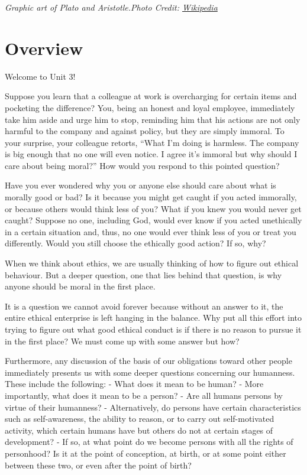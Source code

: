 \documentclass[
]{book}
\begin{document}
\emph{Graphic art of Plato and Aristotle.Photo Credit: \href{https://en.wikipedia.org/wiki/Aristotle\#/media/File:Sanzio_01_Plato_Aristotle.jpg}{Wikipedia}}

\hypertarget{overview-2}{%
\section*{Overview}\label{overview-2}}

Welcome to Unit 3!

Suppose you learn that a colleague at work is overcharging for certain items and pocketing the difference? You, being an honest and loyal employee, immediately take him aside and urge him to stop, reminding him that his actions are not only harmful to the company and against policy, but they are simply immoral. To your surprise, your colleague retorts, ``What I'm doing is harmless. The company is big enough that no one will even notice. I agree it's immoral but why should I care about being moral?'' How would you respond to this pointed question?

Have you ever wondered why you or anyone else should care about what is morally good or bad? Is it because you might get caught if you acted immorally, or because others would think less of you? What if you knew you would never get caught? Suppose no one, including God, would ever know if you acted unethically in a certain situation and, thus, no one would ever think less of you or treat you differently. Would you still choose the ethically good action? If so, why?

When we think about ethics, we are usually thinking of how to figure out ethical behaviour. But a deeper question, one that lies behind that question, is why anyone should be moral in the first place.

It is a question we cannot avoid forever because without an answer to it, the entire ethical enterprise is left hanging in the balance. Why put all this effort into trying to figure out what good ethical conduct is if there is no reason to pursue it in the first place? We must come up with some answer but how?

Furthermore, any discussion of the basis of our obligations toward other people immediately presents us with some deeper questions concerning our humanness. These include the following:
- What does it mean to be human?
- More importantly, what does it mean to be a person?
- Are all humans persons by virtue of their humanness?
- Alternatively, do persons have certain characteristics such as self-awareness, the ability to reason, or to carry out self-motivated activity, which certain humans have but others do not at certain stages of development?
- If so, at what point do we become persons with all the rights of personhood? Is it at the point of conception, at birth, or at some point either between these two, or even after the point of birth?
\end{document}
